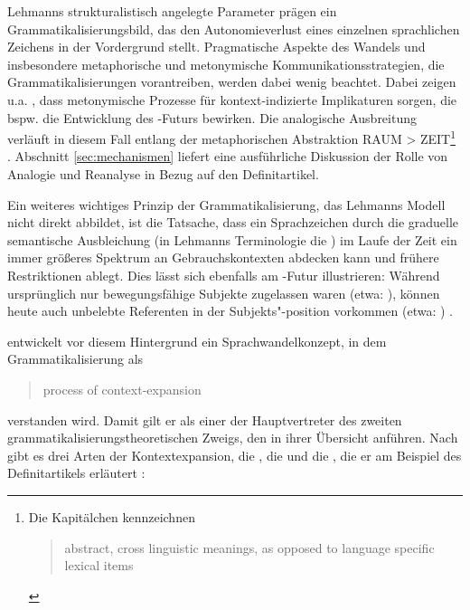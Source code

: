 Lehmanns strukturalistisch angelegte Parameter prägen ein Grammatikalisierungsbild, das den Autonomieverlust eines einzelnen sprachlichen Zeichens in der Vordergrund stellt. Pragmatische Aspekte des Wandels und insbesondere metaphorische und metonymische Kommunikationsstrategien, die Grammatikalisierungen vorantreiben, werden dabei wenig beachtet. Dabei zeigen u.a. \textcite[84--93]{Hopper2006}, dass metonymische Prozesse für kontext-indizierte Implikaturen sorgen, die bspw. die Entwicklung des -Futurs bewirken. Die analogische Ausbreitung verläuft in diesem Fall entlang der metaphorischen Abstraktion \textsc{RAUM > ZEIT}\footnote{Die Kapitälchen kennzeichnen \blockcquote[85]{Hopper2006}{abstract, cross linguistic meanings, as opposed to language specific lexical items}.} \parencite[s. auch][45f.]{Heine1991}. Abschnitt \ref{sec:mechanismen} liefert eine ausführliche Diskussion der Rolle von Analogie und Reanalyse in Bezug auf den Definitartikel. 

Ein weiteres wichtiges Prinzip der Grammatikalisierung, das Lehmanns Modell nicht direkt abbildet, ist die Tatsache, dass ein Sprachzeichen durch die graduelle semantische Ausbleichung  (in Lehmanns Terminologie die ) im Laufe der Zeit ein immer größeres Spektrum an Gebrauchskontexten abdecken kann und frühere Restriktionen ablegt. Dies lässt sich ebenfalls am -Futur illustrieren: Während ursprünglich  nur bewegungsfähige Subjekte zugelassen waren (etwa: ), können heute auch unbelebte Referenten in der Subjekts"-position vorkommen (etwa: )  \parencite[Beispiele nach][5--6]{Bybee1994}. 

\textcite{Himmelmann1997,Himmelmann2004} entwickelt vor diesem Hintergrund ein Sprachwandelkonzept, in dem Grammatikalisierung als \blockcquote[32]{Himmelmann2004}{process of context-expansion} verstanden wird. Damit gilt er als einer der Hauptvertreter des zweiten grammatikalisierungstheoretischen Zweigs, den \textcite[105ff.]{Traugott2013} in ihrer Übersicht anführen. Nach \textcite{Himmelmann2004} gibt es drei Arten der Kontextexpansion, die , die  und die , die er am Beispiel des Definitartikels erläutert \parencite[s.][32--33]{Himmelmann2004}: 

